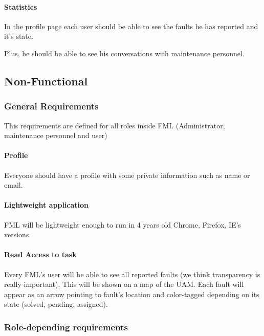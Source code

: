 \paragraph{Statistics} In the profile page each user should be able to see the faults he has reported and it's state.

Plus, he should be able to see his conversations with maintenance personnel.


\subsection{Non-Functional}

\subsubsection{General Requirements}

This requirements are defined for all roles inside FML (Administrator, maintenance personnel and user)

\paragraph{Profile} Everyone should have a profile with some private information such as name or email.

\paragraph{Lightweight application} FML will be lightweight enough to run in 4 years old Chrome, Firefox, IE's versions.

\paragraph{Read Access to task} Every FML's user will be able to see all reported faults (we think transparency is really important). This will be shown on a map of the UAM. Each fault will appear as an arrow pointing to fault's location and color-tagged depending on its state (solved, pending, assigned).

\subsubsection{Role-depending requirements}

